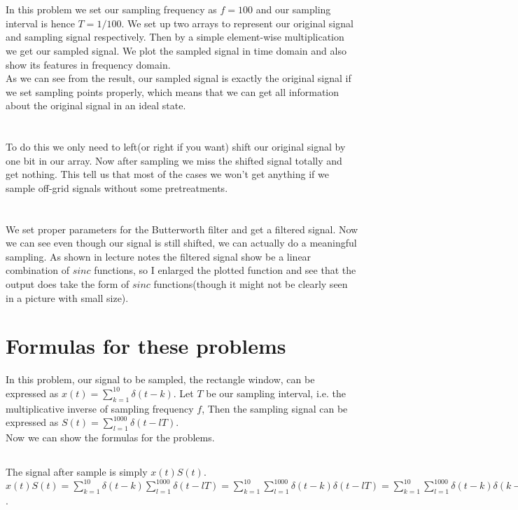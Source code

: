 \documentclass[12pt,letterpaper]{article}
\begin{document}
\section{}
In this problem we set our sampling frequency as $f=100$ and our sampling interval is hence $T=1/100$. We set up two arrays to represent our original signal and sampling signal respectively. Then by a simple element-wise multiplication we get our sampled signal. We plot the sampled signal in time domain and also show its features in frequency domain.\\
As we can see from the result, our sampled signal is exactly the original signal if we set sampling points properly, which means that we can get all information about the original signal in an ideal state.
\section{}
To do this we only need to left(or right if you want) shift our original signal by one bit in our array. Now after sampling we miss the shifted signal totally and get nothing. This tell us that most of the cases we won't get anything if we sample off-grid signals without some pretreatments.
\section{}
We set proper parameters for the Butterworth filter and get a filtered signal. Now we can see even though our signal is still shifted, we can actually do a meaningful sampling. As shown in lecture notes the filtered signal show be a linear combination of $sinc$ functions, so I enlarged the plotted function and see that the output does take the form of $sinc$ functions(though it might not be clearly seen in a picture with small size).
\section{Formulas for these problems}
In this problem, our signal to be sampled, the rectangle window, can be expressed as $x(t)=\sum_{k=1}^{10}\delta(t-k)$. Let $T$ be our sampling interval, i.e. the multiplicative inverse of sampling frequency $f$, Then the sampling signal can be expressed as $S(t)=\sum_{l=1}^{1000}\delta(t-lT)$.\\
Now we can show the formulas for the problems.
\subsection{}
The signal after sample is simply $x(t)S(t)$.\\
$x(t)S(t)=\sum_{k=1}^{10}\delta(t-k)\sum_{l=1}^{1000}\delta(t-lT)=\sum_{k=1}^{10}\sum_{l=1}^{1000}\delta(t-k)\delta(t-lT)=\sum_{k=1}^{10}\sum_{l=1}^{1000}\delta(t-k)\delta(k-lT)=\sum_{k=1}^{10}\delta(t-k)=x(t)$.
\end{document}
